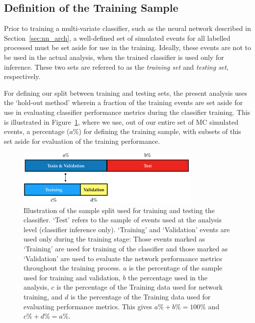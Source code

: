 \subsection{Definition of the Training Sample}
\label{sec:nn_train}

Prior to training a multi-variate classifier, such as the neural network described in Section~\ref{sec:nn_arch},
a well-defined set of simulated events for all labelled processed must be set aside for use in the training.
Ideally, these events are not to be used in the actual analysis, when the trained classifier is used only
for inference.
These two sets are referred to as the \textit{training set} and \textit{testing set}, respectively.

For defining our split between training and testing sets, the present analysis uses the `hold-out method' wherein
a fraction of the training events are set aside for use in evaluating classifier performance metrics
during the classifier training.
This is illustrated in Figure~\ref{fig:nn_sample_split}, where we use, out of our entire set of MC simulated
events, a percentage ($a\%$) for defining the training sample, with subsets of this set aside for evaluation
of the training performance.

\begin{figure}[!htb]
    \begin{center}
        \includegraphics[width=0.8\textwidth]{figures/search_hh/mva/wwbb_nn_sample_breakdown}
        \caption{
            Illustration of the sample split used for training and testing the classifier.
            `Test' refers to the sample of events used at the analysis level (classifier inference only).
            `Training' and `Validation' events are used only during the training stage:
            Those events marked as `Training' are used for training of the classifier and those
            marked as `Validation' are used to evaluate the network performance metrics throughout
            the training process.
            $a$ is the percentage of the sample used for training and validation, $b$ the percentage used
            in the analysis, $c$ is the percentage of the Training data used for network training, and $d$ is the percentage
            of the Training data used for evaluating performance metrics.
            This gives $a\% + b\% = 100\%$ and $c\% + d\% = a\%$.
        }
        \label{fig:nn_sample_split}
    \end{center}
\end{figure}

